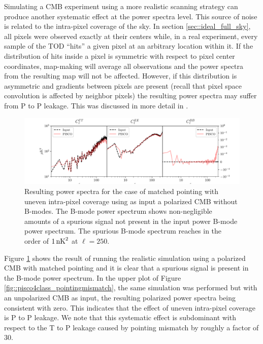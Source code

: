 \documentclass[a4paper,11pt]{article}
\begin{document}
Simulating a CMB experiment using a more realistic scanning strategy can produce another systematic effect at the power spectra level. This source of noise is related to the intra-pixel coverage of the sky. In section \ref{sec::ideal_full_sky}, all pixels were observed exactly at their centers while, in a real experiment, every sample of the TOD ``hits'' a given pixel at an arbitrary location within it. If the distribution of hits inside a pixel is symmetric with respect to pixel center coordinates, map-making will average all observations and the power spectra from the resulting map will not be affected. However, if this distribution is asymmetric and gradients between pixels are present (recall that pixel space convolution is affected by neighbor pixels) the resulting power spectra may suffer from P to P leakage. This was discussed in more detail in \cite{2005poutanen}. 

\begin{figure}
	\centering
	\includegraphics[width=1\textwidth]{figures/cmb_r0d00_CLASS_matchedPointing_matchedBeams_ellipticalBeams.pdf}
	\caption{Resulting power spectra for the case of matched pointing with uneven intra-pixel coverage using as input a polarized CMB without B-modes. The B-mode power spectrum shows non-negligible amounts of a spurious signal not present in the input power B-mode power spectrum. The spurious B-mode spectrum reaches in the order of $1\, \rm{nK}^2$ at $\ell = 250$.}
	\label{fig::pisco4class_intrapixel}
\end{figure}

Figure \ref{fig::pisco4class_intrapixel} shows the result of running the realistic simulation using a polarized CMB with matched pointing and it is clear that a spurious signal is present in the B-mode power spectrum. In the upper plot of Figure \ref{fig::pisco4class_pointingmismatch}, the same simulation was performed but with an unpolarized CMB as input, the resulting polarized power spectra being consistent with zero. This indicates that the effect of uneven intra-pixel coverage is P to P leakage. We note that this systematic effect is subdominant with respect to the T to P leakage caused by pointing mismatch by roughly a factor of $30$.
\end{document}
